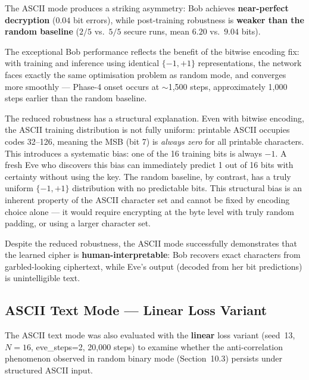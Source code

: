 \documentclass[12pt, a4paper]{article}
\begin{document}
The ASCII mode produces a striking asymmetry: Bob achieves
\textbf{near-perfect decryption} ($0.04$ bit errors), while post-training
robustness is \textbf{weaker than the random baseline} ($2/5$ vs.\ $5/5$
secure runs, mean $6.20$ vs.\ $9.04$ bits).

The exceptional Bob performance reflects the benefit of the bitwise
encoding fix: with training and inference using identical $\{-1,+1\}$
representations, the network faces exactly the same optimisation
problem as random mode, and converges more smoothly --- Phase-4 onset
occurs at $\sim$1{,}500 steps, approximately 1{,}000 steps earlier than the
random baseline.

The reduced robustness has a structural explanation. Even with
bitwise encoding, the ASCII training distribution is not fully uniform:
printable ASCII occupies codes 32--126, meaning the MSB (bit 7) is
\emph{always zero} for all printable characters. This introduces a
systematic bias: one of the 16 training bits is always $-1$. A fresh
Eve who discovers this bias can immediately predict 1 out of 16 bits
with certainty without using the key. The random baseline, by contrast,
has a truly uniform $\{-1,+1\}$ distribution with no predictable bits.
This structural bias is an inherent property of the ASCII character set
and cannot be fixed by encoding choice alone --- it would require
encrypting at the byte level with truly random padding, or using a
larger character set.

Despite the reduced robustness, the ASCII mode successfully
demonstrates that the learned cipher is \textbf{human-interpretable}:
Bob recovers exact characters from garbled-looking ciphertext, while
Eve's output (decoded from her bit predictions) is unintelligible text.
\subsection{ASCII Text Mode --- Linear Loss Variant}
\label{subsec:ascii_linear_results}

The ASCII text mode was also evaluated with the \textbf{linear} loss variant
(seed~13, $N=16$, eve\_steps=2, 20{,}000 steps) to examine whether the
anti-correlation phenomenon observed in random binary mode (Section~10.3)
persists under structured ASCII input.
\end{document}

